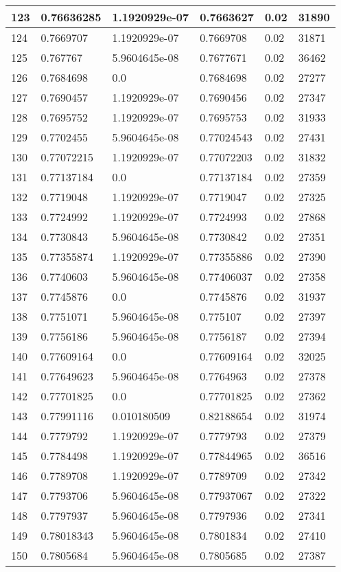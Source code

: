 \begin{longtable}{|l|l|l|l|l|l|}
123 & 0.76636285 & 1.1920929e-07 & 0.7663627 & 0.02 & 31890 \\ \hline 
124 & 0.7669707 & 1.1920929e-07 & 0.7669708 & 0.02 & 31871 \\ \hline 
125 & 0.767767 & 5.9604645e-08 & 0.7677671 & 0.02 & 36462 \\ \hline 
126 & 0.7684698 & 0.0 & 0.7684698 & 0.02 & 27277 \\ \hline 
127 & 0.7690457 & 1.1920929e-07 & 0.7690456 & 0.02 & 27347 \\ \hline 
128 & 0.7695752 & 1.1920929e-07 & 0.7695753 & 0.02 & 31933 \\ \hline 
129 & 0.7702455 & 5.9604645e-08 & 0.77024543 & 0.02 & 27431 \\ \hline 
130 & 0.77072215 & 1.1920929e-07 & 0.77072203 & 0.02 & 31832 \\ \hline 
131 & 0.77137184 & 0.0 & 0.77137184 & 0.02 & 27359 \\ \hline 
132 & 0.7719048 & 1.1920929e-07 & 0.7719047 & 0.02 & 27325 \\ \hline 
133 & 0.7724992 & 1.1920929e-07 & 0.7724993 & 0.02 & 27868 \\ \hline 
134 & 0.7730843 & 5.9604645e-08 & 0.7730842 & 0.02 & 27351 \\ \hline 
135 & 0.77355874 & 1.1920929e-07 & 0.77355886 & 0.02 & 27390 \\ \hline 
136 & 0.7740603 & 5.9604645e-08 & 0.77406037 & 0.02 & 27358 \\ \hline 
137 & 0.7745876 & 0.0 & 0.7745876 & 0.02 & 31937 \\ \hline 
138 & 0.7751071 & 5.9604645e-08 & 0.775107 & 0.02 & 27397 \\ \hline 
139 & 0.7756186 & 5.9604645e-08 & 0.7756187 & 0.02 & 27394 \\ \hline 
140 & 0.77609164 & 0.0 & 0.77609164 & 0.02 & 32025 \\ \hline 
141 & 0.77649623 & 5.9604645e-08 & 0.7764963 & 0.02 & 27378 \\ \hline 
142 & 0.77701825 & 0.0 & 0.77701825 & 0.02 & 27362 \\ \hline 
143 & 0.77991116 & 0.010180509 & 0.82188654 & 0.02 & 31974 \\ \hline 
144 & 0.7779792 & 1.1920929e-07 & 0.7779793 & 0.02 & 27379 \\ \hline 
145 & 0.7784498 & 1.1920929e-07 & 0.77844965 & 0.02 & 36516 \\ \hline 
146 & 0.7789708 & 1.1920929e-07 & 0.7789709 & 0.02 & 27342 \\ \hline 
147 & 0.7793706 & 5.9604645e-08 & 0.77937067 & 0.02 & 27322 \\ \hline 
148 & 0.7797937 & 5.9604645e-08 & 0.7797936 & 0.02 & 27341 \\ \hline 
149 & 0.78018343 & 5.9604645e-08 & 0.7801834 & 0.02 & 27410 \\ \hline 
150 & 0.7805684 & 5.9604645e-08 & 0.7805685 & 0.02 & 27387 \\ \hline 
\end{longtable}